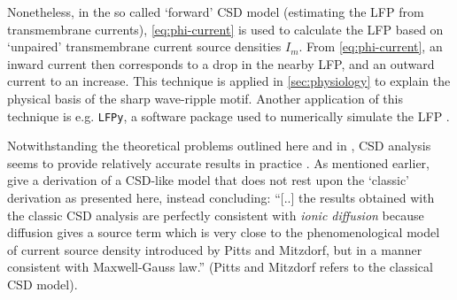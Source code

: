 Nonetheless, in the so called `forward' CSD model (estimating the LFP from transmembrane currents), \cref{eq:phi-current} is used to calculate the LFP based on `unpaired' transmembrane current source densities $I_m$. From \cref{eq:phi-current}, an inward current then corresponds to a drop in the nearby LFP, and an outward current to an increase. This technique is applied in \cref{sec:physiology} to explain the physical basis of the sharp wave-ripple motif. Another application of this technique is e.g. \texttt{LFPy}, a software package used to numerically simulate the LFP \cite{Linden2014}.

Notwithstanding the theoretical problems outlined here and in \cite{Bedard2011}, CSD analysis seems to provide relatively accurate results in practice \cite{Buzsaki2012a,Bedard2011}. As mentioned earlier, \citeauthor{Bedard2011} \cite{Bedard2011} give a derivation of a CSD-like model that does not rest upon the `classic' derivation as presented here, instead concluding: ``[..] the results obtained with the classic CSD analysis are perfectly consistent with \emph{ionic diffusion} because diffusion gives a source term which is very close to the phenomenological model of current source density introduced by Pitts and Mitzdorf, but in a manner consistent with Maxwell-Gauss law.'' (Pitts \cite{Pitts1952} and Mitzdorf \cite{Mitzdorf1985} refers to the classical CSD model).
